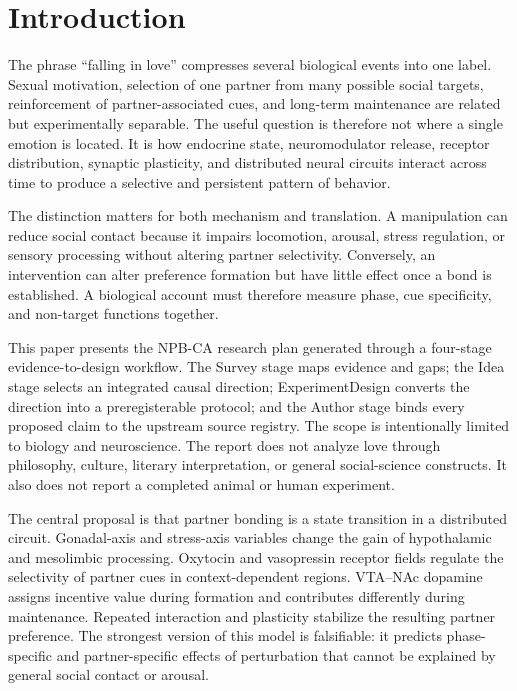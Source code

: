 \documentclass[conference]{IEEEtran}
\begin{document}
\section{Introduction}
The phrase ``falling in love'' compresses several biological events into one label. Sexual motivation, selection of one partner from many possible social targets, reinforcement of partner-associated cues, and long-term maintenance are related but experimentally separable. The useful question is therefore not where a single emotion is located. It is how endocrine state, neuromodulator release, receptor distribution, synaptic plasticity, and distributed neural circuits interact across time to produce a selective and persistent pattern of behavior.

The distinction matters for both mechanism and translation. A manipulation can reduce social contact because it impairs locomotion, arousal, stress regulation, or sensory processing without altering partner selectivity. Conversely, an intervention can alter preference formation but have little effect once a bond is established. A biological account must therefore measure phase, cue specificity, and non-target functions together.

This paper presents the NPB-CA research plan generated through a four-stage evidence-to-design workflow. The Survey stage maps evidence and gaps; the Idea stage selects an integrated causal direction; ExperimentDesign converts the direction into a preregisterable protocol; and the Author stage binds every proposed claim to the upstream source registry. The scope is intentionally limited to biology and neuroscience. The report does not analyze love through philosophy, culture, literary interpretation, or general social-science constructs. It also does not report a completed animal or human experiment.

The central proposal is that partner bonding is a state transition in a distributed circuit. Gonadal-axis and stress-axis variables change the gain of hypothalamic and mesolimbic processing. Oxytocin and vasopressin receptor fields regulate the selectivity of partner cues in context-dependent regions. VTA--NAc dopamine assigns incentive value during formation and contributes differently during maintenance. Repeated interaction and plasticity stabilize the resulting partner preference. The strongest version of this model is falsifiable: it predicts phase-specific and partner-specific effects of perturbation that cannot be explained by general social contact or arousal.
\end{document}
